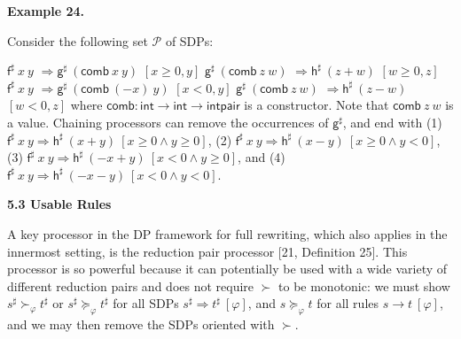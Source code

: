  
 
 
\par\medskip\noindent\textbf{Example 24.}\par
 
 
Consider the following set $\mathcal{P}$ of SDPs:\par
    $\displaystyle{{\mathsf{f}^{\sharp}}\ {x}}\ {y}$ $\displaystyle\Rightarrow{\mathsf{g}^{\sharp}}\ {({{\mathsf{comb}}\ {x}}\ {y})}$ $\displaystyle[x\geq 0,y]$ $\displaystyle{\mathsf{g}^{\sharp}}\ {({{\mathsf{comb}}\ {z}}\ {w})}$ $\displaystyle\Rightarrow{\mathsf{h}^{\sharp}}\ {(z+w)}$ $\displaystyle[w\geq 0,z]$     $\displaystyle{{\mathsf{f}^{\sharp}}\ {x}}\ {y}$ $\displaystyle\Rightarrow{\mathsf{g}^{\sharp}}\ {({{\mathsf{comb}}\ {(-x)}}\ {y})}$ $\displaystyle[x<0,y]$ $\displaystyle{\mathsf{g}^{\sharp}}\ {({{\mathsf{comb}}\ {z}}\ {w})}$ $\displaystyle\Rightarrow{\mathsf{h}^{\sharp}}\ {(z-w)}$ $\displaystyle[w<0,z]$    
where $\mathsf{comb}:\mathsf{int}\rightarrow\mathsf{int}\rightarrow\mathsf{intpair}$ is a constructor. Note that ${{\mathsf{comb}}\ {z}}\ {w}$ is a value. Chaining processors can remove the occurrences of $\mathsf{g}^{\sharp}$, and end with (1) ${{{\mathsf{f}^{\sharp}}\ {x}}\ {y}}\Rightarrow{{\mathsf{h}^{\sharp}}\ {(x+y)}}\ [x\geq 0\wedge y\geq 0]$, (2) ${{{\mathsf{f}^{\sharp}}\ {x}}\ {y}}\Rightarrow{{\mathsf{h}^{\sharp}}\ {(x-y)}}\ [x\geq 0\wedge y<0]$, (3) ${{{\mathsf{f}^{\sharp}}\ {x}}\ {y}}\Rightarrow{{\mathsf{h}^{\sharp}}\ {(-x+y)}}\ [x<0\wedge y\geq 0]$, and (4) ${{{\mathsf{f}^{\sharp}}\ {x}}\ {y}}\Rightarrow{{\mathsf{h}^{\sharp}}\ {(-x-y)}}\ [x<0\wedge y<0]$.\par
 
 
 
 
 
\par\medskip\noindent\textbf{5.3 Usable Rules}\par
 
 
A key processor in the DP framework for full rewriting, which also applies in the innermost setting, is the reduction pair processor [21, Definition 25]. This processor is so powerful because it can potentially be used with a wide variety of different reduction pairs and does not require $\succ$ to be monotonic: we must show ${s^{\sharp}}\mathrel{\succ}_{\varphi}{t^{\sharp}}$ or ${s^{\sharp}}\mathrel{\succeq}_{\varphi}{t^{\sharp}}$ for all SDPs ${s^{\sharp}}\Rightarrow{t^{\sharp}}\ [\varphi]$, and ${s}\mathrel{\succeq}_{\varphi}{t}$ for all rules ${s}\rightarrow{t}\ [\varphi]$, and we may then remove the SDPs oriented with $\succ$.\par
 
